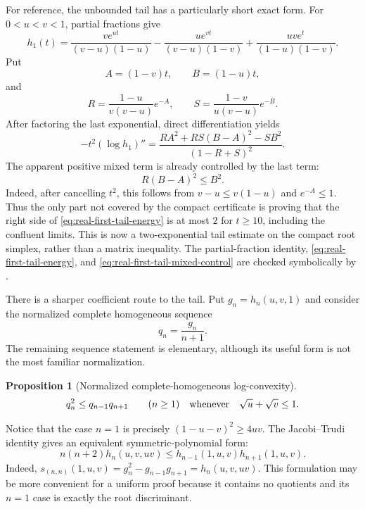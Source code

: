 \documentclass[11pt]{article}
\newtheorem{proposition}[theorem]{Proposition}
\theoremstyle{remark}
\begin{document}
For reference, the unbounded tail has a particularly short exact form.
For $0<u<v<1$, partial fractions give
\[
 h_1(t)=\frac{v e^{ut}}{(v-u)(1-u)}
 -\frac{u e^{vt}}{(v-u)(1-v)}
 +\frac{uv e^t}{(1-u)(1-v)}.
\]
Put
\[
 A=(1-v)t,\qquad B=(1-u)t,
\]
and
\[
 R=\frac{1-u}{v(v-u)}e^{-A},\qquad
 S=\frac{1-v}{u(v-u)}e^{-B}.
\]
After factoring the last exponential, direct differentiation yields
\begin{equation}\label{eq:real-first-tail-energy}
 -t^2(\log h_1)''
 =\frac{RA^2+RS(B-A)^2-SB^2}{(1-R+S)^2}.
\end{equation}
The apparent positive mixed term is already controlled by the last term:
\begin{equation}\label{eq:real-first-tail-mixed-control}
 R(B-A)^2\leq B^2.
\end{equation}
Indeed, after cancelling $t^2$, this follows from
$v-u\leq v(1-u)$ and $e^{-A}\leq1$.  Thus the only part not covered by
the compact certificate is proving that the right side of
\eqref{eq:real-first-tail-energy} is at most $2$ for $t\geq10$, including
the confluent limits.  This is now a two-exponential tail estimate on the
compact root simplex, rather than a matrix inequality.  The partial-fraction
identity, \eqref{eq:real-first-tail-energy}, and
\eqref{eq:real-first-tail-mixed-control} are checked symbolically by
.

There is a sharper coefficient route to the tail.  Put
$g_n=h_n(u,v,1)$ and consider the normalized complete homogeneous sequence
\begin{equation}\label{eq:real-first-normalized-complete-target}
 q_n=\frac{g_n}{n+1}.
\end{equation}
The remaining sequence statement is elementary, although its useful form is
not the most familiar normalization.
\begin{proposition}[Normalized complete-homogeneous log-convexity]
\label{prop:real-first-normalized-complete-logconvex}
\begin{equation}\label{eq:real-first-normalized-complete-logconvex}
 q_n^2\leq q_{n-1}q_{n+1}\qquad(n\geq1)
 \quad\hbox{whenever}\quad \sqrt u+\sqrt v\leq1.
\end{equation}
\end{proposition}
Notice that the case $n=1$ is precisely
$(1-u-v)^2\geq4uv$.
The Jacobi--Trudi identity gives an equivalent symmetric-polynomial form:
\begin{equation}\label{eq:real-first-schur-target}
 n(n+2)h_n(u,v,uv)
 \leq h_{n-1}(1,u,v)h_{n+1}(1,u,v).
\end{equation}
Indeed,
$s_{(n,n)}(1,u,v)=g_n^2-g_{n-1}g_{n+1}=h_n(u,v,uv)$.
This formulation may be more convenient for a uniform proof because it
contains no quotients and its $n=1$ case is exactly the root discriminant.
\end{document}

